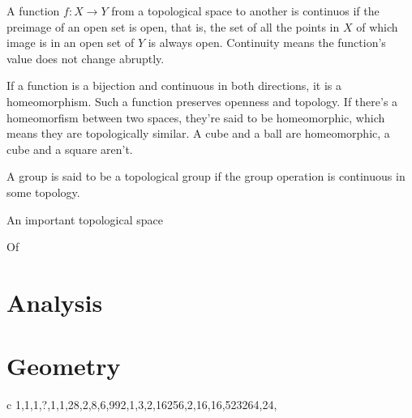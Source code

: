\documentclass[11pt,oneside,%
]{memoir}
\newenvironment{eqna}{\begin{IEEEeqnarray}{c}}{\end{IEEEeqnarray}\ignorespacesafterend}
\theoremstyle{definition}
\begin{document}
A function \(f:X\rightarrow Y\) from a topological space to another is continuos if the preimage of an open set is open, that is, the set of all the points in \(X\) of which image is in an open set of \(Y\) is always open. Continuity means the function's value does not change abruptly.

If a function is a bijection and continuous in both directions, it is a homeomorphism. Such a function preserves openness and topology. If there's a homeomorfism between two spaces, they're said to be homeomorphic, which means they are topologically similar. A cube and a ball are homeomorphic, a cube and a square aren't.


A group is said to be a topological group if the group operation is continuous in some topology.

An important topological space


Of









    

\section{Analysis}




\section{Geometry}

\begin{eqna}
    1,1,1,?,1,1,28,2,8,6,992,1,3,2,16256,2,16,16,523264,24,\dotsc\nonumber
\end{eqna}
\end{document}
